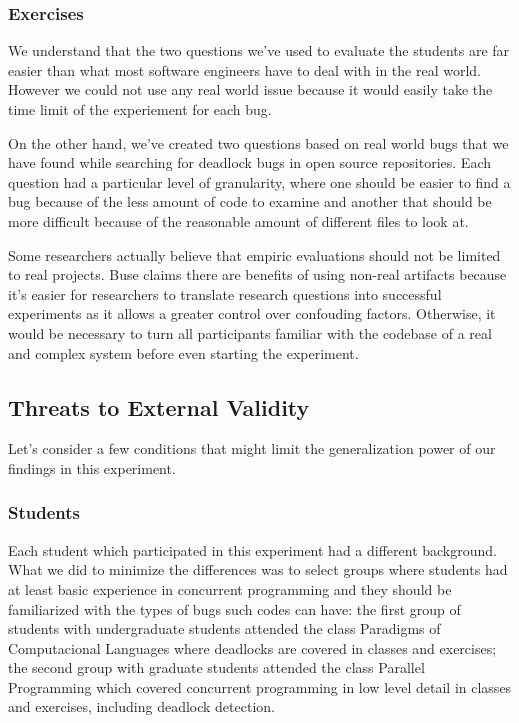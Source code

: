 \subsubsection{Exercises}

We understand that the two questions we've used to evaluate the students are far easier than what most software engineers have to deal with in the real world. However we could not use any real world issue because it would easily take the time limit of the experiement for each bug.

On the other hand, we've created two questions based on real world bugs that we have found while searching for deadlock bugs in open source repositories. Each question had a particular level of granularity, where one should be easier to find a bug because of the less amount of code to examine and another that should be more difficult because of the reasonable amount of different files to look at.

Some researchers actually believe that empiric evaluations should not be limited to real projects. Buse claims there are benefits of using non-real artifacts \citep{buse} because it's easier for researchers to translate research questions into successful experiments as it allows a greater control over confouding factors. Otherwise, it would be necessary to turn all participants familiar with the codebase of a real and complex system before even starting the experiment. 

\subsection{Threats to External Validity}

Let's consider a few conditions that might limit the generalization power of our findings in this experiment.

\subsubsection{Students}

Each student which participated in this experiment had a different background. What we did to minimize the differences was to select groups where students had at least basic experience in concurrent programming and they should be familiarized with the types of bugs such codes can have: the first group of students with undergraduate students attended the class Paradigms of Computacional Languages where deadlocks are covered in classes and exercises; the second group with graduate students attended the class Parallel Programming which covered concurrent programming in low level detail in classes and exercises, including deadlock detection.

